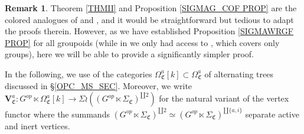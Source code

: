 \documentclass[a4paper,10pt
,draft
]{article}%
\numberwithin{equation}{section}
\numberwithin{figure}{section}
\theoremstyle{definition} %
\newtheorem{remark}[equation]{Remark}%
\newcommand{\1}{\ensuremath{\mathbbm 1}}%
\begin{document}
\begin{remark}\label{STRTED REM}
	Theorem \ref{THMII} and Proposition \ref{SIGMAG_COF PROP}
	are the colored analogues of 
	\cite[Lemma 6.64]{BP_geo} and \cite[Rem. 6.70]{BP_geo},
	and it would be straightforward but tedious to adapt the proofs therein.
%	
	However, as we have established 
	Proposition \ref{SIGMAWRGF PROP} for all groupoids
	(while in \cite{BP_geo}
	we only had access to \cite[Prop. 6.25]{BP_geo},
	which covers only groups),
	here we will be able to provide a significantly simpler proof.
\end{remark}



In the following, we use of the categories
$\Omega^{a}_{\mathfrak{C}}[k] 
\subset 
\Omega^{a}_{\mathfrak{C}}$
of alternating trees discussed in \S \ref{OPC_MS_SEC}.
Moreover, we write
$\boldsymbol{V}^a_{\mathfrak{C}}
\colon G^{op} \ltimes \Omega^{a}_{\mathfrak{C}}[k] 
\to 
\Sigma \wr 
\left((G^{op} \ltimes \Sigma_{\mathfrak{C}})^{\amalg 2}\right)$ 
for the natural variant of the vertex functor 
where the summands 
$(G^{op} \ltimes \Sigma_{\mathfrak{C}})^{\amalg 2} \simeq
(G^{op} \ltimes \Sigma_{\mathfrak{C}})^{\amalg \{a,i\}}$
separate active and inert vertices.
\end{document}
